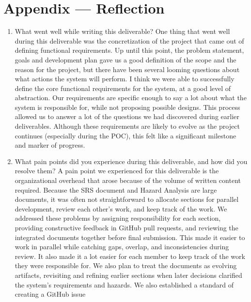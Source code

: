 \documentclass{article}
\begin{document}
\newpage{}

\section{Appendix --- Reflection}




\begin{enumerate}
    \item What went well while writing this deliverable?
    One thing that went well during this deliverable was
    the concretization of the project that came out of defining functional requirements.
    Up until this point, the problem statement, goals and development plan gave us a good definition
    of the scope and the reason for the project, but there have been several looming questions about
    what actions the system will perform. I think we were able to successfully define the core functional requirements
    for the system, at a good level of abstraction. Our requirements are specific enough to say a lot about what the
    system is responsible for, while not proposing possible designs. This process allowed us to answer a lot of the questions
    we had discovered during earlier deliverables. Although these requirements are likely to evolve
    as the project continues (especially during the POC), this felt like a significant milestone and marker of progress.
    \item What pain points did you experience during this deliverable, and how
    did you resolve them?
    A pain point we experienced for this deliverable is the organizational overhead that arose because of the volume
    of written content required. Because the SRS document and Hazard Analysis are large documents, it was often not
    straightforward to allocate sections for parallel development, review each other's work, and keep track of the work. We addressed these problems by assigning responsibility for each section, providing constructive feedback in GitHub pull requests, and
    reviewing the integrated documents together before final submission. This made it easier to work in parallel while catching gaps, overlap, and
    inconsistencies during review. It also made it a lot easier for each member to keep track of the work they were responsible for. We also plan to treat the documents as evolving artifacts, revisiting and refining earlier sections
    when later decisions clarified the system's requirements and hazards. We also established a standard of creating a GitHub issue

\end{enumerate}
\end{document}
